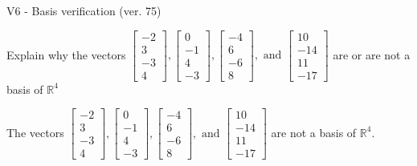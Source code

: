 \begin{exercise}
  \begin{exerciseTitle}V6 - Basis verification (ver. 75)\end{exerciseTitle}
  \begin{exerciseStatement}
    Explain why the vectors \(\left[\begin{array}{r}
-2 \\
3 \\
-3 \\
4
\end{array}\right] , \left[\begin{array}{r}
0 \\
-1 \\
4 \\
-3
\end{array}\right] , \left[\begin{array}{r}
-4 \\
6 \\
-6 \\
8
\end{array}\right] , \text{ and } \left[\begin{array}{r}
10 \\
-14 \\
11 \\
-17
\end{array}\right]\) are or are not a basis of \(\mathbb{R}^4\)	


  \end{exerciseStatement}
  \begin{exerciseAnswer}
   The vectors \(\left[\begin{array}{r}
-2 \\
3 \\
-3 \\
4
\end{array}\right] , \left[\begin{array}{r}
0 \\
-1 \\
4 \\
-3
\end{array}\right] , \left[\begin{array}{r}
-4 \\
6 \\
-6 \\
8
\end{array}\right] , \text{ and } \left[\begin{array}{r}
10 \\
-14 \\
11 \\
-17
\end{array}\right]\) 
  	 are not  a basis of \(\mathbb{R}^4\).
  


  \end{exerciseAnswer}
\end{exercise}